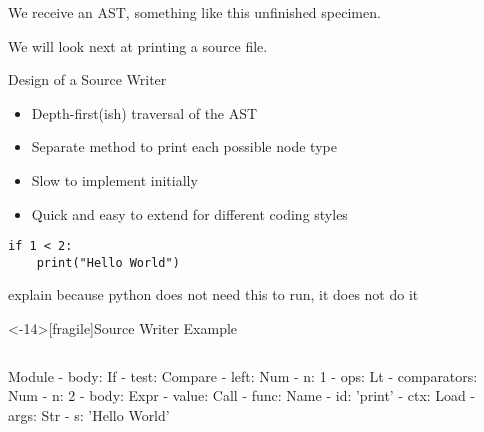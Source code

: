 We receive an AST, something like this unfinished specimen.


We will look next at printing a source file.

\begin{frame}[fragile]{Design of a Source Writer}
\begin{itemize}
\item Depth-first(ish) traversal of the AST
\item Separate method to print each possible node type
\item Slow to implement initially
\item Quick and easy to extend for different coding styles
\end{itemize}

\begin{lstlisting}
if 1 < 2:
    print("Hello World")
\end{lstlisting}
\end{frame}

explain because python does not need this to run, it does not do it


\begin{frame}<-14>[fragile]{Source Writer Example}
\begin{columns}[b]
{\small
\begin{semiverbatim}
\alert<2-13>{Module}
\alert<2-13>{  - body: If}
\alert<3-5>{    - test: Compare}
\alert<3>{      - left: Num}
\alert<3>{        - n: 1}
\alert<4>{      - ops: Lt}
\alert<5>{      - comparators: Num}
\alert<5>{        - n: 2}
\alert<7-13>{    - body: Expr}
\alert<7-13>{      - value: Call}
\alert<7-8>{        - func: Name}
\alert<7>{          - id: 'print'}
\alert<8>{          - ctx: Load}
\alert<10-12>{        - args: Str}
\alert<11>{          - s: 'Hello World'}
\end{semiverbatim}}
\begin{semiverbatim}
\textbf{
  
\quad\quad{}
}
\end{semiverbatim}
\end{columns}
\end{frame}


